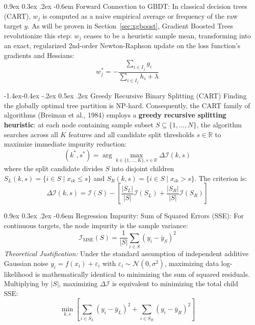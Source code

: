 \documentclass[11pt,a4paper]{article}
\makeatletter
\renewcommand\subsection{\@startsection{subsection}{2}{\z@}%
                                     {-1.4ex\@plus -0.4ex \@minus -.2ex}%
                                     {0.5ex \@plus .2ex}%
                                     {\normalfont\normalsize\bfseries}}
\renewcommand\paragraph{\@startsection{paragraph}{4}{\z@}%
                                     {0.9ex \@plus0.3ex \@minus.2ex}%
                                     {-0.6em}%
                                     {\normalfont\normalsize\bfseries}}
\newcommand{\R}{\mathbb{R}}
\makeatother
\begin{document}
\paragraph{Forward Connection to GBDT:} 
In classical decision trees (CART), $w_j$ is computed as a naive empirical average or frequency of the raw target $y$. As will be proven in Section~\ref{sec:xgboost}, Gradient Boosted Trees revolutionize this step: $w_j$ ceases to be a heuristic sample mean, transforming into an exact, regularized 2nd-order Newton-Raphson update on the loss function's gradients and Hessians:
\begin{equation*}
    w_j^* = -\frac{\sum_{i \in I_j} g_i}{\sum_{i \in I_j} h_i + \lambda}
\end{equation*}

\subsection{Greedy Recursive Binary Splitting (CART)}
\label{sec:greedy_splitting}
Finding the globally optimal tree partition is NP-hard. Consequently, the CART family of algorithms (Breiman et al., 1984) employs a \textbf{greedy recursive splitting heuristic}: at each node containing sample subset $S \subseteq \{1, \dots, N\}$, the algorithm searches across all $K$ features and all candidate split thresholds $s \in \R$ to maximize immediate impurity reduction:
\begin{equation}
    (k^*, s^*) = \arg\max_{k \in \{1, \dots, K\}, s \in \R} \Delta \mathcal{I}(k, s)
\end{equation}
where the split candidate divides $S$ into disjoint children $S_L(k, s) = \{ i \in S \mid x_{ik} \le s \}$ and $S_R(k, s) = \{ i \in S \mid x_{ik} > s \}$. The criterion is:
\begin{equation}
    \Delta \mathcal{I}(k, s) = \mathcal{I}(S) - \left[ \frac{|S_L|}{|S|} \mathcal{I}(S_L) + \frac{|S_R|}{|S|} \mathcal{I}(S_R) \right]
\end{equation}

\paragraph{Regression Impurity: Sum of Squared Errors (SSE):}
\label{sec:cart_loss}
For continuous targets, the node impurity is the sample variance:
\begin{equation}
    \mathcal{I}_{\text{MSE}}(S) = \frac{1}{|S|} \sum_{i \in S} (y_i - \bar{y}_S)^2
\end{equation}
\emph{Theoretical Justification:} Under the standard assumption of independent additive Gaussian noise $y_i = f(x_i) + \varepsilon_i$ with $\varepsilon_i \sim \mathcal{N}(0, \sigma^2)$, maximizing data log-likelihood is mathematically identical to minimizing the sum of squared residuals. Multiplying by $|S|$, maximizing $\Delta \mathcal{I}$ is equivalent to minimizing the total child SSE:
\begin{equation}
    \min_{k, s} \left[ \sum_{i \in S_L} (y_i - \bar{y}_L)^2 + \sum_{i \in S_R} (y_i - \bar{y}_R)^2 \right]
\end{equation}
\end{document}
